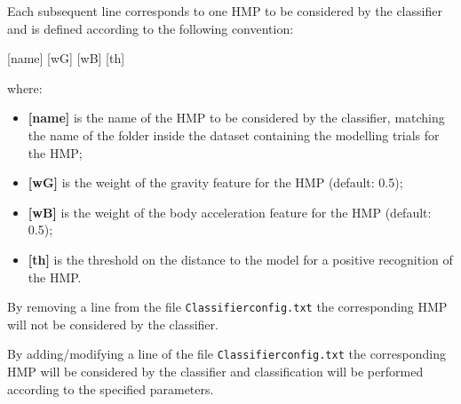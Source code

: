 \documentclass[10pt,a4paper]{report}
\begin{document}
Each subsequent line corresponds to one HMP to be considered by the classifier and is defined according to the following convention:
\begin{center}
[name] [wG] [wB] [th]
\end{center}
where:
\begin{itemize}
\item \textbf{[name]} is the name of the HMP to be considered by the classifier, matching the name of the folder inside the dataset containing the modelling trials for the HMP;
\item \textbf{[wG]} is the weight of the gravity feature for the HMP (default: 0.5);
\item \textbf{[wB]} is the weight of the body acceleration feature for the HMP (default: 0.5);
\item \textbf{[th]} is the threshold on the distance to the model for a positive recognition of the HMP.
\end{itemize}

By removing a line from the file \verb+Classifierconfig.txt+ the corresponding HMP will not be considered by the classifier.

By adding/modifying a line of the file \verb+Classifierconfig.txt+ the corresponding HMP will be considered by the classifier and classification will be performed according to the specified parameters.
\end{document}
